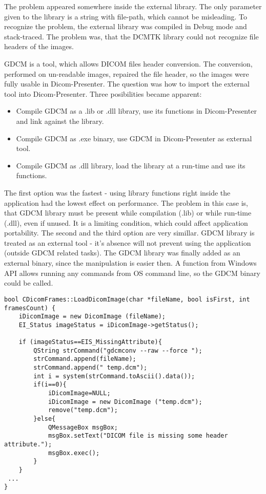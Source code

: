 
The problem appeared somewhere inside the external library. The only parameter given to the library is a string with file-path, which cannot be misleading. To recognize the problem, the external library was compiled in Debug mode and stack-traced. The problem was, that the DCMTK library could not recognize file headers of the images.

GDCM\cite{gdcm_home} is a tool, which allows DICOM files header conversion. The conversion, performed on un-readable images, repaired the file header, so the images were fully usable in Dicom-Presenter. The question was how to import the external tool into Dicom-Presenter. Three posibilities became apparent:

\begin{itemize}
\item Compile GDCM as a .lib or .dll library, use its functions in Dicom-Presenter and link against the library.
\item Compile GDCM as .exe binary, use GDCM in Dicom-Presenter as external tool.
\item Compile GDCM as .dll library, load the library at a run-time and use its functions.
\end{itemize}

The first option was the fastest - using library functions right inside the application had the lowest effect on performance. The problem in this case is, that GDCM library must be present while compilation (.lib) or while run-time (.dll), even if unused. It is a limiting condition, which could affect application portability. The second and the third option are very simillar. GDCM library is treated as an external tool - it's absence will not prevent using the application (outside GDCM related tasks). The GDCM library was finally added as an external binary, since the manipulation is easier then. A  function from Windows  API allows running any commands from OS command line, so the GDCM binary could be called.

\begin{lstlisting}[caption={A conversion of DICOM files header using GDCM as external tool.}]
bool CDicomFrames::LoadDicomImage(char *fileName, bool isFirst, int framesCount) {
	iDicomImage = new DicomImage (fileName);
	EI_Status imageStatus = iDicomImage->getStatus();

	if (imageStatus==EIS_MissingAttribute){			
		QString strCommand("gdcmconv --raw --force ");
		strCommand.append(fileName);
		strCommand.append(" temp.dcm");
		int i = system(strCommand.toAscii().data());
		if(i==0){
			iDicomImage=NULL;
			iDicomImage = new DicomImage ("temp.dcm");
			remove("temp.dcm");
		}else{
			QMessageBox msgBox;
			msgBox.setText("DICOM file is missing some header attribute.");
			msgBox.exec();
		}		
	}
 ...
}
\end{lstlisting}